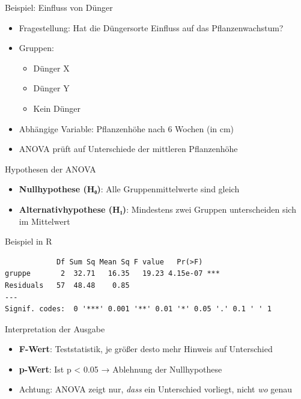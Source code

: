 \documentclass[
  ignorenonframetext,
]{beamer}
\providecommand{\tightlist}{%
  \setlength{\itemsep}{0pt}\setlength{\parskip}{0pt}}
\begin{document}
\begin{frame}{Beispiel: Einfluss von Dünger}
\protect{}\label{beispiel-einfluss-von-duxfcnger}
\begin{itemize}
\tightlist
\item
  Fragestellung: Hat die Düngersorte Einfluss auf das Pflanzenwachstum?
\item
  Gruppen:

  \begin{itemize}
  \tightlist
  \item
    Dünger X
  \item
    Dünger Y
  \item
    Kein Dünger
  \end{itemize}
\item
  Abhängige Variable: Pflanzenhöhe nach 6 Wochen (in cm)
\item
  ANOVA prüft auf Unterschiede der mittleren Pflanzenhöhe
\end{itemize}
\end{frame}

\begin{frame}{Hypothesen der ANOVA}
\protect{}\label{hypothesen-der-anova}
\begin{itemize}
\tightlist
\item
  \textbf{Nullhypothese (H₀)}: Alle Gruppenmittelwerte sind gleich
\item
  \textbf{Alternativhypothese (H₁)}: Mindestens zwei Gruppen
  unterscheiden sich im Mittelwert
\end{itemize}
\end{frame}

\begin{frame}[fragile]{Beispiel in R}
\protect{}\label{beispiel-in-r}
\begin{verbatim}
            Df Sum Sq Mean Sq F value   Pr(>F)    
gruppe       2  32.71   16.35   19.23 4.15e-07 ***
Residuals   57  48.48    0.85                     
---
Signif. codes:  0 '***' 0.001 '**' 0.01 '*' 0.05 '.' 0.1 ' ' 1
\end{verbatim}
\end{frame}

\begin{frame}{Interpretation der Ausgabe}
\protect{}\label{interpretation-der-ausgabe}
\begin{itemize}
\tightlist
\item
  \textbf{F-Wert}: Teststatistik, je größer desto mehr Hinweis auf
  Unterschied
\item
  \textbf{p-Wert}: Ist p \textless{} 0.05 → Ablehnung der Nullhypothese
\item
  Achtung: ANOVA zeigt nur, \emph{dass} ein Unterschied vorliegt, nicht
  \emph{wo} genau
\end{itemize}
\end{frame}
\end{document}
